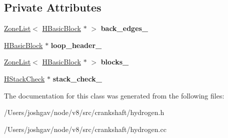 \subsection*{Private Attributes}
\begin{DoxyCompactItemize}
\item 
\hyperlink{classv8_1_1internal_1_1_zone_list}{Zone\+List}$<$ \hyperlink{classv8_1_1internal_1_1_h_basic_block}{H\+Basic\+Block} $\ast$ $>$ {\bfseries back\+\_\+edges\+\_\+}\hypertarget{classv8_1_1internal_1_1_h_loop_information_a47f2fd7cf620986b62f30d5a61c1b977}{}\label{classv8_1_1internal_1_1_h_loop_information_a47f2fd7cf620986b62f30d5a61c1b977}

\item 
\hyperlink{classv8_1_1internal_1_1_h_basic_block}{H\+Basic\+Block} $\ast$ {\bfseries loop\+\_\+header\+\_\+}\hypertarget{classv8_1_1internal_1_1_h_loop_information_a7123a800c2ecc91386dfe0da715f6c87}{}\label{classv8_1_1internal_1_1_h_loop_information_a7123a800c2ecc91386dfe0da715f6c87}

\item 
\hyperlink{classv8_1_1internal_1_1_zone_list}{Zone\+List}$<$ \hyperlink{classv8_1_1internal_1_1_h_basic_block}{H\+Basic\+Block} $\ast$ $>$ {\bfseries blocks\+\_\+}\hypertarget{classv8_1_1internal_1_1_h_loop_information_a6cc1e92b4a42dca7449531a55e1b8703}{}\label{classv8_1_1internal_1_1_h_loop_information_a6cc1e92b4a42dca7449531a55e1b8703}

\item 
\hyperlink{classv8_1_1internal_1_1_h_stack_check}{H\+Stack\+Check} $\ast$ {\bfseries stack\+\_\+check\+\_\+}\hypertarget{classv8_1_1internal_1_1_h_loop_information_a7c8c5869046053118a34246f3f6e1c70}{}\label{classv8_1_1internal_1_1_h_loop_information_a7c8c5869046053118a34246f3f6e1c70}

\end{DoxyCompactItemize}


The documentation for this class was generated from the following files\+:\begin{DoxyCompactItemize}
\item 
/\+Users/joshgav/node/v8/src/crankshaft/hydrogen.\+h\item 
/\+Users/joshgav/node/v8/src/crankshaft/hydrogen.\+cc\end{DoxyCompactItemize}
